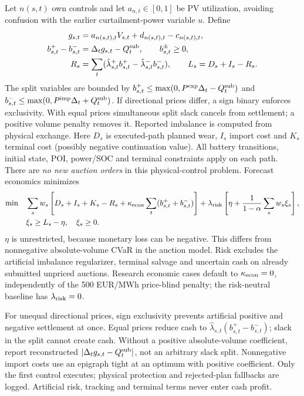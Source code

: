 Let $n(s,t)$ own controls and let $a_{n,t}\in[0,1]$ be PV utilization, avoiding
confusion with the earlier curtailment-power variable $u$. Define
\begin{align}
 g_{s,t}&=a_{n(s,t),t}V_{s,t}+d_{n(s,t),t}-c_{n(s,t),t},\\
 b^+_{s,t}-b^-_{s,t}&=\Delta_tg_{s,t}-Q_t^{\rm sub},\qquad b^\pm_{s,t}\ge0,\\
 R_s&=\sum_t(\hat\lambda^+_{s,t}b^+_{s,t}-\hat\lambda^-_{s,t}b^-_{s,t}),
 \qquad L_s=D_s+I_s-R_s.
\end{align}
The split variables are bounded by
$b^+_{s,t}\le\max(0,P^{\rm exp}\Delta_t-Q_t^{\rm sub})$ and
$b^-_{s,t}\le\max(0,P^{\rm imp}\Delta_t+Q_t^{\rm sub})$.
If directional prices differ, a sign binary enforces exclusivity. With equal
prices simultaneous split slack cancels from settlement; a positive volume
penalty removes it. Reported imbalance is computed from physical exchange.
Here $D_s$ is executed-path planned wear, $I_s$ import cost and $K_s$ terminal
cost (possibly negative continuation value). All battery transitions, initial
state, POI, power/SOC and terminal constraints apply on each path. There are
\emph{no new auction orders} in this physical-control problem. Forecast economics
minimizes
\begin{align}\label{eq:research-mpc}
 \min\quad &\sum_sw_s\left[D_s+I_s+K_s-R_s+\kappa_{\rm econ}
                 \sum_t(b^+_{s,t}+b^-_{s,t})\right]
 +\lambda_{\rm risk}\left[\eta+
        \frac1{1-\alpha}\sum_sw_s\xi_s\right],\\
 &\xi_s\ge L_s-\eta,\quad\xi_s\ge0.\notag
\end{align}
$\eta$ is unrestricted, because monetary loss can be negative. This differs
from nonnegative absolute-volume CVaR in the auction model. Risk excludes the
artificial imbalance regularizer, terminal salvage and uncertain cash on
already submitted unpriced auctions. Research economic cases default to
$\kappa_{\rm econ}=0$, independently of the 500 EUR/MWh price-blind penalty;
the risk-neutral baseline has $\lambda_{\rm risk}=0$.

For unequal directional prices, sign exclusivity prevents artificial positive
and negative settlement at once. Equal prices reduce cash to
$\hat\lambda_{s,t}(b^+_{s,t}-b^-_{s,t})$; slack in the split cannot create cash.
Without a positive absolute-volume coefficient, report reconstructed
$|\Delta_tg_{s,t}-Q_t^{\rm sub}|$, not an arbitrary slack split. Nonnegative
import costs use an epigraph tight at an optimum with positive coefficient.
Only the first control executes; physical protection and rejected-plan fallbacks
are logged. Artificial risk, tracking and terminal terms never enter cash profit.

